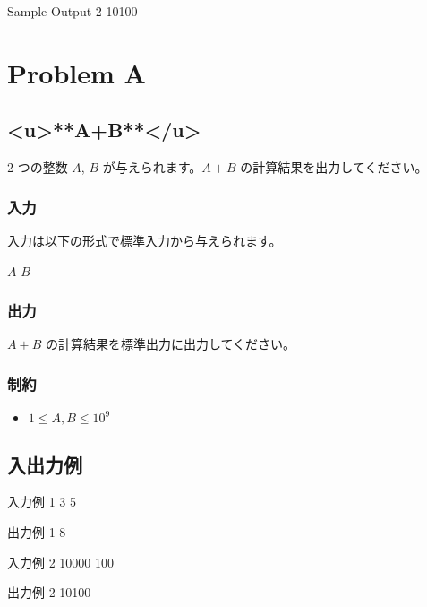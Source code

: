 \documentclass[11pt,a4paper]{article}
\begin{document}
\begin{itembox}[l]{ Sample Output 2 }
10100

\end{itembox}






\section{Problem A}

\subsection{<u>**A+B**</u>}

2 つの整数 $A$, $B$ が与えられます。$A + B$ の計算結果を出力してください。

\subsubsection{入力}

入力は以下の形式で標準入力から与えられます。

\begin{screen}
$A$ $B$
\end{screen}

\subsubsection{出力}

$A + B$ の計算結果を標準出力に出力してください。

\subsubsection{制約}

\begin{itemize}
    \item $1 \leq A, B \leq 10^{9}$
\end{itemize}



\subsection{ 入出力例 }



\begin{itembox}[l]{ 入力例 1 }
3 5

\end{itembox}



\begin{itembox}[l]{ 出力例 1 }
8

\end{itembox}







\begin{itembox}[l]{ 入力例 2 }
10000 100

\end{itembox}



\begin{itembox}[l]{ 出力例 2 }
10100

\end{itembox}
\end{document}

